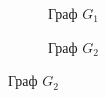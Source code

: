 \begin{figure}[H]
  \centering
  
  \begin{subfigure}[b]{0.4\textwidth}

    \centering
    
    \caption{Граф \(G_{1}\)}

  \end{subfigure}
  \qquad
  \begin{subfigure}[b]{0.4\textwidth}

    \centering
    
    \caption{Граф \(G_{2}\)}

  \end{subfigure}
\end{figure}